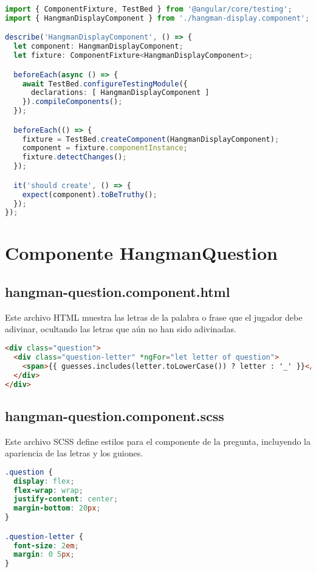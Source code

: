 \begin{lstlisting}[language=TypeScript]
import { ComponentFixture, TestBed } from '@angular/core/testing';
import { HangmanDisplayComponent } from './hangman-display.component';

describe('HangmanDisplayComponent', () => {
  let component: HangmanDisplayComponent;
  let fixture: ComponentFixture<HangmanDisplayComponent>;

  beforeEach(async () => {
    await TestBed.configureTestingModule({
      declarations: [ HangmanDisplayComponent ]
    }).compileComponents();
  });

  beforeEach(() => {
    fixture = TestBed.createComponent(HangmanDisplayComponent);
    component = fixture.componentInstance;
    fixture.detectChanges();
  });

  it('should create', () => {
    expect(component).toBeTruthy();
  });
});
\end{lstlisting}

\section{Componente HangmanQuestion}

\subsection{hangman-question.component.html}

Este archivo HTML muestra las letras de la palabra o frase que el jugador debe adivinar, ocultando las letras que aún no han sido adivinadas.

\begin{lstlisting}[language=HTML]
<div class="question">
  <div class="question-letter" *ngFor="let letter of question">
    <span>{{ guesses.includes(letter.toLowerCase()) ? letter : '_' }}</span>
  </div>
</div>
\end{lstlisting}

\subsection{hangman-question.component.scss}

Este archivo SCSS define estilos para el componente de la pregunta, incluyendo la apariencia de las letras y los guiones.

\begin{lstlisting}[language=CSS]
.question {
  display: flex;
  flex-wrap: wrap;
  justify-content: center;
  margin-bottom: 20px;
}

.question-letter {
  font-size: 2em;
  margin: 0 5px;
}
\end{lstlisting}

